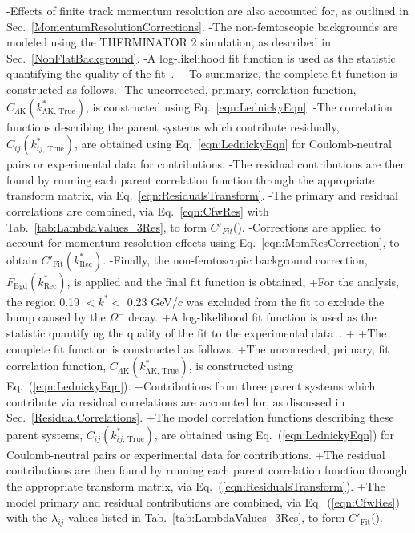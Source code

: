 \begin{table}[htbp]
-Effects of finite track momentum resolution are also accounted for, as outlined in Sec.~\ref{MomentumResolutionCorrections}.
-The non-femtoscopic backgrounds are modeled using the THERMINATOR 2 simulation, as described in Sec.~\ref{NonFlatBackground}.
-A log-likelihood fit function is used as the statistic quantifying the quality of the fit~\cite{Lisa:2005dd}.
-
-To summarize, the complete fit function is constructed as follows.
-The uncorrected, primary, correlation function, $C_{\Lambda\mathrm{K}}(k^{*}_{\mathrm{\Lambda K,\,True}})$, is constructed using Eq.~\ref{eqn:LednickyEqn}.
-The correlation functions describing the parent systems which contribute residually, $C_{ij}(k^{*}_{ij,\,\mathrm{True}})$, are obtained using Eq.~\ref{eqn:LednickyEqn} for Coulomb-neutral pairs or experimental data for \XiKpm contributions.
-The residual contributions are then found by running each parent correlation function through the appropriate transform matrix, via Eq.~\ref{eqn:ResidualsTransform}.
-The primary and residual correlations are combined, via Eq.~\ref{eqn:CfwRes} with Tab.~\ref{tab:LambdaValues_3Res}, to form $C'_{Fit}$(\ktrue).
-Corrections are applied to account for momentum resolution effects using Eq.~\ref{eqn:MomResCorrection}, to obtain $C'_{\mathrm{Fit}}(k^{*}_{\mathrm{Rec}})$.
-Finally, the non-femtoscopic background correction, $F_{\mathrm{Bgd}}(k^{*}_{\mathrm{Rec}})$, is applied and the final fit function is obtained,
+For the \LamKchM analysis, the region 0.19 $< k^{*} <$ 0.23 GeV/$c$ was excluded from the fit to exclude the bump caused by the $\Omega^{-}$ decay.
+A log-likelihood fit function is used as the statistic quantifying the quality of the fit to the experimental data~\cite{Lisa:2005dd}.
+
+The complete fit function is constructed as follows.
+The uncorrected, primary, fit correlation function, $C_{\Lambda\mathrm{K}}(k^{*}_{\mathrm{\Lambda K,\,True}})$, is constructed using Eq.~(\ref{eqn:LednickyEqn}).
+Contributions from three parent systems which contribute via residual correlations are accounted for, as discussed in Sec.~\ref{ResidualCorrelations}.
+The model correlation functions describing these parent systems, $C_{ij}(k^{*}_{ij,\,\mathrm{True}})$, are obtained using Eq.~(\ref{eqn:LednickyEqn}) for Coulomb-neutral pairs or experimental data for \XiKpm contributions.
+The residual contributions are then found by running each parent correlation function through the appropriate transform matrix, via Eq.~(\ref{eqn:ResidualsTransform}).
+The model primary and residual contributions are combined, via Eq.~(\ref{eqn:CfwRes}) with the $\lambda_{ij}$ values listed in Tab.~\ref{tab:LambdaValues_3Res}, to form $C'_{\mathrm{Fit}}$(\ktrue).

\end{table}
